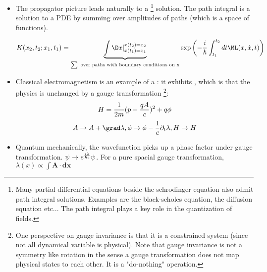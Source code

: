 \documentclass[10pt]{scrartcl}
\begin{document}
\begin{itemize}
	 We superpose those solutions for a given initial wavefunction: \footnote{This is also known as a convolution}
	\[ \underbrace{\psi(x'', t'')}_{\text{evolved wavefunction}} = \int dx' K(x'', t''; x', t') \underbrace{\psi(x', t')}_{\text{initial condition}} \]
	For example the propagator for the free schrodinger equation is:
	\[ K(x'', t''; x', t') = \sqrt{m \over 2 \pi \hbar i (t'' - t')} \exp \left( {i m (x'' - x')^2 \over 2 \hbar (t'' -  t')}\right)\]
	As you see the wavepacket of a free particle just spreads into a gaussian with variance $\propto t$.
	The propagator for the simple harmonic oscillator is:
	\[K(x'', t'';  x', t') = \sqrt{m \omega \over 2 \pi i \hbar \sin \left( \omega (t'' - t') \right) } \exp \left({i m \omega \over 2 \hbar i \sin(t'' - t')}  \times \left[ 2 (x'' + x')^2 \cos \left( \omega t \right) - 2 x' x'' \right] \right)   \]
	
	One can solve these propagators by evolving a dirac delta function. Another way is  by evaluating the transition amplitude using the path integral.  The path integral for these simples systems is a (\emph{very big}) gaussian integral.
	
	\item The propagator picture leads naturally to a   \footnote{Many partial differential equations beside the schrodinger equation also admit path integral solutions.  Examples are the black-scholes equation, the diffusion equation etc...  The path integral plays a key role in the quantization of fields.} solution.  The path integral is a solution to a PDE by summing over amplitudes of paths (which is a space of functions). 
	
	\[ K(x_2, t_2; x_1, t_1) = \underbrace{\int \D x|_{x(t_1) = x_1}^{x(t_2) = x_2}}_{\sum \text{ over paths with boundary conditions on x}} \exp \left( -{i \over \hbar} \int_{t_1}^{t_2} dt \ML(x, \dot{x}, t) \right) \]
	
	\item  Classical electromagnetism is an example of a : it exhibits , which is that the physics is unchanged by a gauge transformation \footnote{One perspective on gauge invariance is that it is a constrained system (since not all dynamical variable is physical).  Note that gauge invariance is not a symmetry like rotation in the sense a gauge transformation does not map physical states to each other.  It is a "do-nothing" operation.}:
	\[H = {1 \over 2m}(p - {qA \over c})^2 + q \phi \]
	\[A \rightarrow A + \grad \lambda, \space \phi \rightarrow \phi - {1 \over c} \partial_t \lambda, \space H \rightarrow H \]
	\item Quantum mechanically, the wavefunction picks up a phase factor under gauge transformation.
	$\psi \rightarrow e^{i \lambda \over \hbar c} \psi$.
	For a pure spacial gauge transformation, $\lambda(x) \propto \int \mathbf{A} \cdot \mathbf{dx}$
	

\end{itemize}
\end{document}
